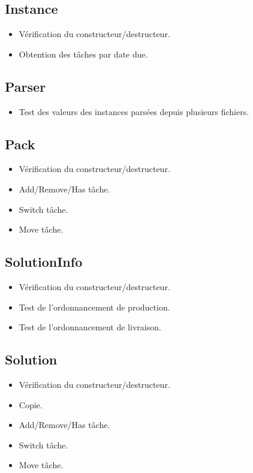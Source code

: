 \documentclass[hideweeklyreports]{polytech/polytech}
\begin{document}
			\subsection{Instance}
				\begin{itemize}
					\item Vérification du constructeur/destructeur.
					\item Obtention des tâches par date due.
				\end{itemize}
				
			\subsection{Parser}
				\begin{itemize}
					\item Test des valeurs des instances parsées depuis plusieurs fichiers.
				\end{itemize}
				
			\subsection{Pack}
				\begin{itemize}
					\item Vérification du constructeur/destructeur.
					\item Add/Remove/Has tâche.
					\item Switch tâche.
					\item Move tâche.
				\end{itemize}
				
			\subsection{SolutionInfo}
				\begin{itemize}
					\item Vérification du constructeur/destructeur.
					\item Test de l'ordonnancement de production.
					\item Test de l'ordonnancement de livraison.
				\end{itemize}
				
			\subsection{Solution}
				\begin{itemize}
					\item Vérification du constructeur/destructeur.
					\item Copie.
					\item Add/Remove/Has tâche.
					\item Switch tâche.
					\item Move tâche.
				\end{itemize}
				
\end{document}
